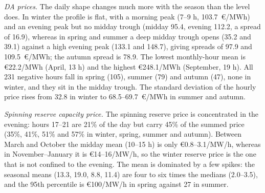 \documentclass[5p,times,twocolumn]{elsarticle}
\begin{document}
\begin{table}[t]
\caption{Market participation ladder of the three winter trees (same layout as Table~\ref{tab:market_ladder}; expected net operating cost on the tree, \euro). HiGHS, gap $\le0.5\%$.}
\label{tab:winter_ladder}
\centering
\scriptsize
\setlength{\tabcolsep}{2.2pt}
\renewcommand{\arraystretch}{1.1}
\end{table}

\textit{DA prices.} The daily shape changes much more with the season than the level does. In winter the profile is flat, with a morning peak (7--9 h, 103.7~\euro/MWh) and an evening peak but no midday trough (midday 95.4, evening 112.2, a spread of 16.9), whereas in spring and summer a deep midday trough opens (35.2 and 39.1) against a high evening peak (133.1 and 148.7), giving spreads of 97.9 and 109.5~\euro/MWh; the autumn spread is 78.9. The lowest monthly-hour mean is \euro 22.2/MWh (April, 13 h) and the highest \euro 248.1/MWh (September, 19 h). All 231 negative hours fall in spring (105), summer (79) and autumn (47), none in winter, and they sit in the midday trough. The standard deviation of the hourly price rises from 32.8 in winter to 68.5--69.7~\euro/MWh in summer and autumn.

\textit{Spinning reserve capacity price.} The spinning reserve price is concentrated in the evening: hours 17--21 are 21\% of the day but carry 45\% of the summed price (35\%, 41\%, 51\% and 57\% in winter, spring, summer and autumn). Between March and October the midday mean (10--15 h) is only \euro 0.8--3.1/MW/h, whereas in November--January it is \euro 14--16/MW/h, so the winter reserve price is the one that is not confined to the evening. The mean is dominated by a few spikes: the seasonal means (13.3, 19.0, 8.8, 11.4) are four to six times the medians (2.0--3.5), and the 95th percentile is \euro 100/MW/h in spring against 27 in summer.
\end{document}
